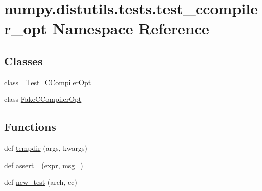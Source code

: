 \hypertarget{namespacenumpy_1_1distutils_1_1tests_1_1test__ccompiler__opt}{}\section{numpy.\+distutils.\+tests.\+test\+\_\+ccompiler\+\_\+opt Namespace Reference}
\label{namespacenumpy_1_1distutils_1_1tests_1_1test__ccompiler__opt}
\subsection*{Classes}
\begin{DoxyCompactItemize}
\item 
class \hyperlink{classnumpy_1_1distutils_1_1tests_1_1test__ccompiler__opt_1_1__Test__CCompilerOpt}{\+\_\+\+Test\+\_\+\+C\+Compiler\+Opt}
\item 
class \hyperlink{classnumpy_1_1distutils_1_1tests_1_1test__ccompiler__opt_1_1FakeCCompilerOpt}{Fake\+C\+Compiler\+Opt}
\end{DoxyCompactItemize}
\subsection*{Functions}
\begin{DoxyCompactItemize}
\item 
def \hyperlink{namespacenumpy_1_1distutils_1_1tests_1_1test__ccompiler__opt_a7978af3044f224b3543f300bc7fd9f61}{tempdir} (args, kwargs)
\item 
def \hyperlink{namespacenumpy_1_1distutils_1_1tests_1_1test__ccompiler__opt_a2039c1c6d64584c7c23a8161cdf2e020}{assert\+\_\+} (expr, \hyperlink{namespacenumpy_ab96122eb8e44294b488b0ef93ec27d38}{msg}=\textquotesingle{}\textquotesingle{})
\item 
def \hyperlink{namespacenumpy_1_1distutils_1_1tests_1_1test__ccompiler__opt_acbd748235a69808be093cea22fa0fc53}{new\+\_\+test} (arch, cc)
\end{DoxyCompactItemize}
